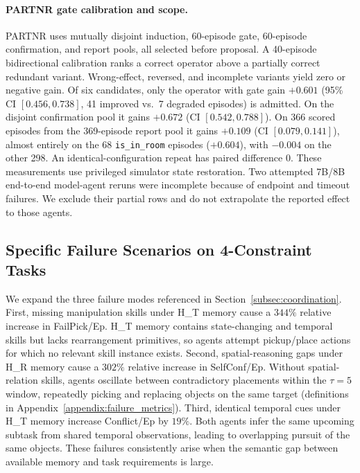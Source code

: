\documentclass{article}
\theoremstyle{plain}
\theoremstyle{definition}
\theoremstyle{remark}
\begin{document}
\paragraph{PARTNR gate calibration and scope.}
PARTNR uses mutually disjoint induction, 60-episode gate, 60-episode confirmation, and report pools, all selected before proposal. A 40-episode bidirectional calibration ranks a correct operator above a partially correct redundant variant. Wrong-effect, reversed, and incomplete variants yield zero or negative gain. Of six candidates, only the operator with gate gain $+0.601$ (95\% CI $[0.456,0.738]$, 41 improved vs.\ 7 degraded episodes) is admitted. On the disjoint confirmation pool it gains $+0.672$ (CI $[0.542,0.788]$). On 366 scored episodes from the 369-episode report pool it gains $+0.109$ (CI $[0.079,0.141]$), almost entirely on the 68 \texttt{is\_in\_room} episodes ($+0.604$), with $-0.004$ on the other 298. An identical-configuration repeat has paired difference 0. These measurements use privileged simulator state restoration. Two attempted 7B/8B end-to-end model-agent reruns were incomplete because of endpoint and timeout failures. We exclude their partial rows and do not extrapolate the reported effect to those agents.


\subsection{Specific Failure Scenarios on 4-Constraint Tasks}
\label{sec:failure_scenarios_appendix}

We expand the three failure modes referenced in Section~\ref{subsec:coordination}. First, missing manipulation skills under H\_T memory cause a $344\%$ relative increase in FailPick/Ep. H\_T memory contains state-changing and temporal skills but lacks rearrangement primitives, so agents attempt pickup/place actions for which no relevant skill instance exists. Second, spatial-reasoning gaps under H\_R memory cause a $302\%$ relative increase in SelfConf/Ep. Without spatial-relation skills, agents oscillate between contradictory placements within the $\tau=5$ window, repeatedly picking and replacing objects on the same target (definitions in Appendix~\ref{appendix:failure_metrics}). Third, identical temporal cues under H\_T memory increase Conflict/Ep by $19\%$. Both agents infer the same upcoming subtask from shared temporal observations, leading to overlapping pursuit of the same objects. These failures consistently arise when the semantic gap between available memory and task requirements is large.
\end{document}
